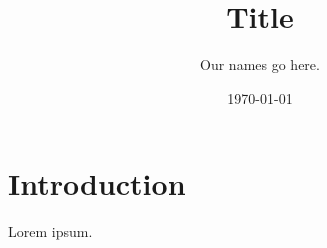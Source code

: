 \documentclass[12pt]{article}
\begin{document}
 
\title{Title} 
\author{Our names go here.} 
\date{\today} 
\maketitle 


\section{Introduction}

Lorem ipsum.
\end{document}
